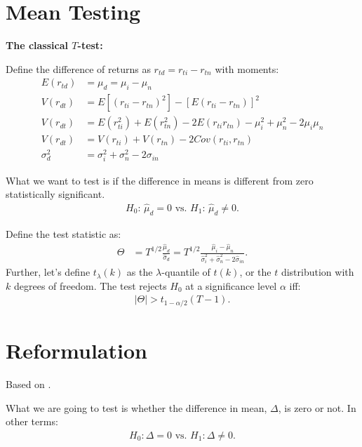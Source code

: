 \documentclass[12pt,oneside,a4paper]{article}
\begin{document}


\clearpage
\section{Mean Testing}

\textbf{The classical $T$-test:}

Define the difference of returns as $r_{td} = r_{ti} - r_{tn}$ with moments:
\begin{align*}
E(r_{td}) &= \mu_{d} = \mu_{i} - \mu_{n} 
	\\
V(r_{dt})&= E[(r_{ti} - r_{tn})^2] - [E(r_{ti} - r_{tn})]^2
\\
V(r_{dt})&= E(r^2_{ti}) + E(r^2_{tn}) - 2E(r_{ti}r_{tn}) - \mu_{i}^2 + \mu_{n}^2 - 2\mu_{i}\mu_{n}
\\
V(r_{dt}) &= V(r_{ti}) + V(r_{tn}) - 2Cov(r_{ti},r_{tn}) 
\\
\sigma^2_{d} &= \sigma^2_{i} + \sigma^2_{n} - 2\sigma_{in}
\end{align*}

What we want to test is if the difference in means is different from zero statistically significant.
\begin{align*}
	H_{0}: \, \hat{\mu}_{d} = 0
	\text{ vs. }
	H_{1}: \, \hat{\mu}_{d} \neq 0.
\end{align*}

Define the test statistic as:
\begin{align}
\Theta &= T^{1/2} \frac{\hat{\mu}_{d}}{\hat{\sigma}_{d}} = 
 T^{1/2} \frac{\hat{\mu}_{i} - \hat{\mu}_{n}}{\hat{\sigma}^2_{i} + \hat{\sigma}^2_{n} - 2\hat{\sigma}_{in}}.
\end{align}
Further, let's define $t_{\lambda}(k)$ as the $\lambda$-quantile of $t(k)$, or the $t$ distribution with $k$ degrees of freedom.
The test rejects $H_{0}$ at a significance level $\alpha$ iff:
\begin{align*}
	|\Theta| > t_{1-\alpha/2}(T-1).
\end{align*}

\section{Reformulation}
Based on \cite{lw2008-sr, lw2011-var}.

What we are going to test is whether the difference in mean, $\Delta$, is zero or not.
In other terms:
\begin{align*}
	H_{0}: \Delta=0 \text{ vs. } H_{1}: \Delta \neq 0.
\end{align*}
\end{document}
